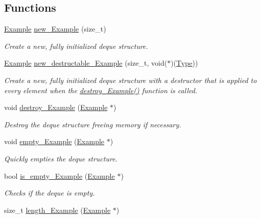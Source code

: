 \subsection*{Functions}
\begin{DoxyCompactItemize}
\item 
\hyperlink{structExample}{Example} \hyperlink{group__DEQUE_gae0c6f52c89e2b087e19e3062186144da}{new\+\_\+\+Example} (size\+\_\+t)
\begin{DoxyCompactList}\small\item\em Create a new, fully initialized deque structure. \end{DoxyCompactList}\item 
\hyperlink{structExample}{Example} \hyperlink{group__DEQUE_ga4a210705b6f22fe97b7033bb8854a4d6}{new\+\_\+destructable\+\_\+\+Example} (size\+\_\+t, void($\ast$)(\hyperlink{group__DEQUE_gac9c83c2070eb6b5891cf742b90f54c68}{Type}))
\begin{DoxyCompactList}\small\item\em Create a new, fully initialized deque structure with a destructor that is applied to every element when the {\itshape \hyperlink{group__DEQUE_gad9998ed1cadaff66c209e8b666185f70}{destroy\+\_\+\+Example()}} function is called. \end{DoxyCompactList}\item 
void \hyperlink{group__DEQUE_gad9998ed1cadaff66c209e8b666185f70}{destroy\+\_\+\+Example} (\hyperlink{structExample}{Example} $\ast$)
\begin{DoxyCompactList}\small\item\em Destroy the deque structure freeing memory if necessary. \end{DoxyCompactList}\item 
void \hyperlink{group__DEQUE_gab8ed3578aa5708a09831653caaa88b8a}{empty\+\_\+\+Example} (\hyperlink{structExample}{Example} $\ast$)
\begin{DoxyCompactList}\small\item\em Quickly empties the deque structure. \end{DoxyCompactList}\item 
bool \hyperlink{group__DEQUE_ga43fb8662cb9960b573bc2368b27a915c}{is\+\_\+empty\+\_\+\+Example} (\hyperlink{structExample}{Example} $\ast$)
\begin{DoxyCompactList}\small\item\em Checks if the deque is empty. \end{DoxyCompactList}\item 
size\+\_\+t \hyperlink{group__DEQUE_gab751404fe5166cbc70dc8093b5167839}{length\+\_\+\+Example} (\hyperlink{structExample}{Example} $\ast$)

\end{DoxyCompactItemize}

